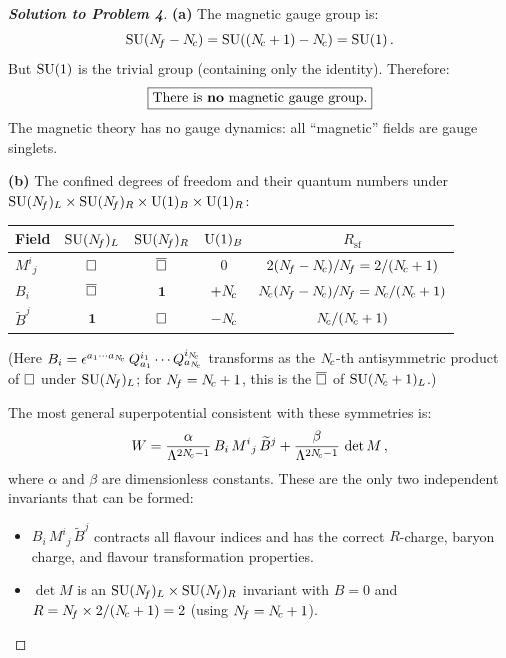 \documentclass[11pt,a4paper]{article}
\begin{document}
\begin{proof}[\textbf{Solution to Problem 4}]

\textbf{(a)} The magnetic gauge group is:
\[
  \mathrm{SU}(N_{\!f} - N_{\!c}) = \mathrm{SU}((N_{\!c} + 1) - N_{\!c}) = \mathrm{SU}(1)\,.
\]
But $\mathrm{SU}(1)$ is the trivial group (containing only the identity).
Therefore:
\[
  \boxed{\text{There is \textbf{no} magnetic gauge group.}}
\]
The magnetic theory has no gauge dynamics: all ``magnetic'' fields are
gauge singlets.

\textbf{(b)} The confined degrees of freedom and their quantum numbers
under $\mathrm{SU}(N_{\!f})_L \times \mathrm{SU}(N_{\!f})_R \times \mathrm{U}(1)_B \times \mathrm{U}(1)_R$:

\renewcommand{\arraystretch}{1.3}
\begin{center}
\begin{tabular}{@{}l c c c c@{}}
\toprule
\textbf{Field} & $\mathrm{SU}(N_{\!f})_L$ & $\mathrm{SU}(N_{\!f})_R$ & $\mathrm{U}(1)_B$ & $R_{\mathrm{sf}}$ \\
\midrule
$M^i{}_j$ & $\square$ & $\overline{\square}$ & $0$
  & $2(N_{\!f} - N_{\!c})/N_{\!f} = 2/(N_{\!c} + 1)$ \\
$B_i$ & $\overline{\square}$ & $\mathbf{1}$ & $+N_{\!c}$
  & $N_{\!c}(N_{\!f} - N_{\!c})/N_{\!f} = N_{\!c}/(N_{\!c} + 1)$ \\
$\widetilde{B}^j$ & $\mathbf{1}$ & $\square$ & $-N_{\!c}$
  & $N_{\!c}/(N_{\!c} + 1)$ \\
\bottomrule
\end{tabular}
\end{center}

(Here $B_i = \epsilon^{a_1\cdots a_{N_{\!c}}}\, Q^{i_1}_{a_1} \cdots
Q^{i_{N_{\!c}}}_{a_{N_{\!c}}}$ transforms as the $N_{\!c}$-th antisymmetric product
of $\square$ under $\mathrm{SU}(N_{\!f})_L$; for $N_{\!f} = N_{\!c} + 1$, this is the
$\overline{\square}$ of $\mathrm{SU}(N_{\!c}+1)_L$.)

The most general superpotential consistent with these symmetries is:
\begin{equation}
  W = \frac{\alpha}{\Lambda^{2N_{\!c} - 1}}\, B_i\, M^i{}_j\,
  \widetilde{B}^j
  + \frac{\beta}{\Lambda^{2N_{\!c} - 1}}\, \det M\,,
\end{equation}
where $\alpha$ and $\beta$ are dimensionless constants.  These are the
only two independent invariants that can be formed:
\begin{itemize}
  \item $B_i\, M^i{}_j\, \widetilde{B}^j$ contracts all flavour
    indices and has the correct $R$-charge, baryon charge, and flavour
    transformation properties.
  \item $\det M$ is an $\mathrm{SU}(N_{\!f})_L \times \mathrm{SU}(N_{\!f})_R$ invariant with
    $B = 0$ and $R = N_{\!f} \times 2/(N_{\!c}+1) = 2$ (using
    $N_{\!f} = N_{\!c} + 1$).
\end{itemize}


\end{proof}
\end{document}
